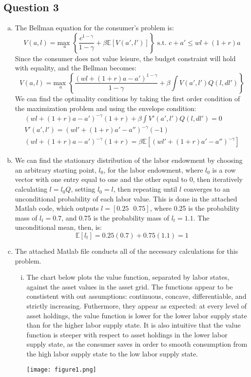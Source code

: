 \documentclass{article}
\newcommand{\usmax}[1]{\underset{#1}{\text{max }}}
\newcommand{\E}[1]{\mathbb{E}\left[#1\right]} %
\begin{document}
\subsection*{Question 3}

\begin{enumerate}[(a)]
	\item The Bellman equation for the consumer's problem is:
		\[
			V(a,l) = \usmax{a}\left\{\frac{c^{1-\gamma}}{1-\gamma} + \beta\E{V(a',l')}\right\}\text{ s.t. } c + a' \leq wl + (1+r)a 
		\]
		Since the consumer does not value leisure, the budget constraint will hold with equality, and the Bellman becomes:
		\[
			V(a,l) = \usmax{a}\left\{\frac{(wl + (1+r)a - a')^{1-\gamma}}{1-\gamma} + \beta\int V(a',l')Q(l,dl')\right\}
		\]
		We can find the optimality conditions by taking the first order condition of the maximization problem and using the envelope condition:
		\begin{eqnarray*}
			\left(wl + (1+r)a - a'\right)^{-\gamma}(1+r) + \beta\int V'(a',l')Q(l,dl') = 0	\\
			V'(a',l') = \left(wl' + (1+r)a' - a''\right)^{-\gamma}(-1)	\\
			\left(wl + (1+r)a - a'\right)^{-\gamma}(1+r) = \beta\E{\left(wl' + (1+r)a' - a''\right)^{-\gamma}}
		\end{eqnarray*}
	
	\item We can find the stationary distribution of the labor endowment by choosing an arbitrary starting point, $l_0$, for the labor endowment, where $l_0$ is a row vector with one entry equal to one and the other equal to 0, then iteratively calculating ${l=l_0Q}$, setting ${l_0=l}$, then repeating until $l$ converges to an unconditional probability of each labor value. This is done in the attached Matlab code, which outputs ${l=\left[0.25\text{ }0.75\right]}$, where 0.25 is the probability mass of ${l_t=0.7}$, and 0.75 is the probability mass of ${l_t=1.1}$. The unconditional mean, then, is:
		\[
			\E{l_t} = 0.25(0.7) + 0.75(1.1) = 1
		\]
	
	
	\item The attached Matlab file conducts all of the necessary calculations for this problem.
		\begin{enumerate}[i.]
			\item The chart below plots the value function, separated by labor states, against the asset values in the asset grid. The functions appear to be constistent with out assumptions: continuous, concave, differentiable, and strictly increasing. Futhermore, they appear as expected: at every level of asset holdings, the value function is lower for the lower labor supply state than for the higher labor supply state. It is also intuitive that the value function is steeper with respect to asset holdings in the lower labor supply state, as the consumer saves in order to smooth consumption from the high labor supply state to the low labor supply state.
				\begin{center}
					\texttt{[image: figure1.png]}
				\end{center}
			

\end{enumerate}
\end{enumerate}
\end{document}

